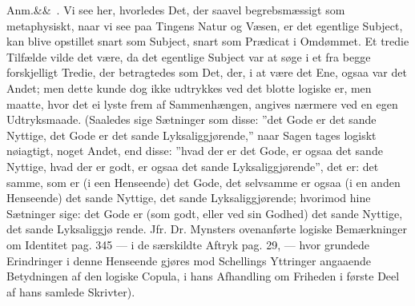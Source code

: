 \documentclass[12pt]{book}
\def\sperr#1{#1}%
\def\textit#1{#1}%
\newcommand{\sperr}[1]{\textls[180]{#1}}
\newcommand{\anm}[1]{%
  \par\vspace{0.5\baselineskip}%
  \noindent\hspace{\parindent}\sperr{Anm.}\ifx&#1&\else~\textit{#1}.\fi
  \enspace\ignorespaces
}
\newcommand{\opage}[1]{\marginnote{\footnotesize\textit{[#1]}}}
\begin{document}
\anm{} Vi see her, hvorledes Det, der saavel begrebsmæssigt som metaphysiskt, naar vi see
paa Tingens Natur og Væsen, er det egentlige Subject, kan blive opstillet snart som
Subject, snart som Prædicat i Omdømmet. Et tredie Tilfælde vilde det være, da det egentlige
Subject var at søge i et fra begge forskjelligt Tredie, der betragtedes som Det, der, i at
være det Ene, ogsaa var det Andet; men dette kunde dog ikke udtrykkes ved det blotte
logiske er, men maatte, hvor det ei lyste frem af Sammenhængen, angives nærmere ved en egen
Udtryksmaade. (Saaledes sige Sætninger som disse: ''det Gode er det sande Nyttige, det Gode
er det sande Lyksaliggjørende,'' naar Sagen tages logiskt nøiagtigt, noget Andet, end
disse: ''hvad der er det Gode, er ogsaa det sande Nyttige, hvad der er godt, er ogsaa det
sande Lyksaliggjørende'', det er: det samme, som er (i een Henseende) det Gode, det
selvsamme er ogsaa (i en anden Henseende) det sande Nyttige, det sande Lyksaliggjørende;
hvorimod hine Sætninger sige: det Gode er (som godt, eller ved sin Godhed) det sande
Nyttige, det sande Lyksaliggjø%
\opage{265}rende. Jfr. \textit{Dr.} Mynsters ovenanførte logiske Bemærkninger om Identitet
\textit{pag.} 345 --- i de særskildte Aftryk \textit{pag.} 29, --- hvor grundede
Erindringer i denne Henseende gjøres mod Schellings Yttringer angaaende Betydningen af den
logiske Copula, i hans Afhandling om Friheden i første Deel af hans samlede Skrivter).
\end{document}
